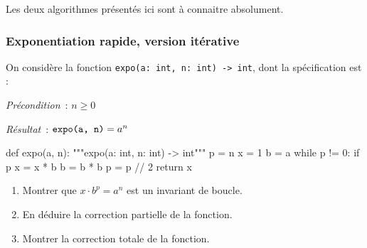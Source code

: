 \documentclass{magnolia}
\begin{document}
Les deux algorithmes présentés ici sont à connaitre absolument.

\subsubsection{Exponentiation rapide, version itérative}

On considère la fonction \verb!expo(a: int, n: int) -> int!,
  dont la spécification est :
  \begin{description}
    \item \emph{Précondition}~: $n \geq 0$
    \item \emph{Résultat}~: $\verb!expo(a, n)! = a^{n}$
  \end{description}
\begin{pythoncodeline}
def expo(a, n):
    """expo(a: int, n: int) -> int"""
    p = n
    x = 1
    b = a
    while p != 0:
        if p %
            x = x * b
        b = b * b
        p = p // 2
    return x
\end{pythoncodeline}
  \begin{enumerate}
    \item Montrer que $x\cdot b^{p} = a^{n}$ est un invariant de boucle.
    \item En déduire la correction partielle de la fonction.
    \item Montrer la correction totale de la fonction.
  \end{enumerate}
\end{document}
